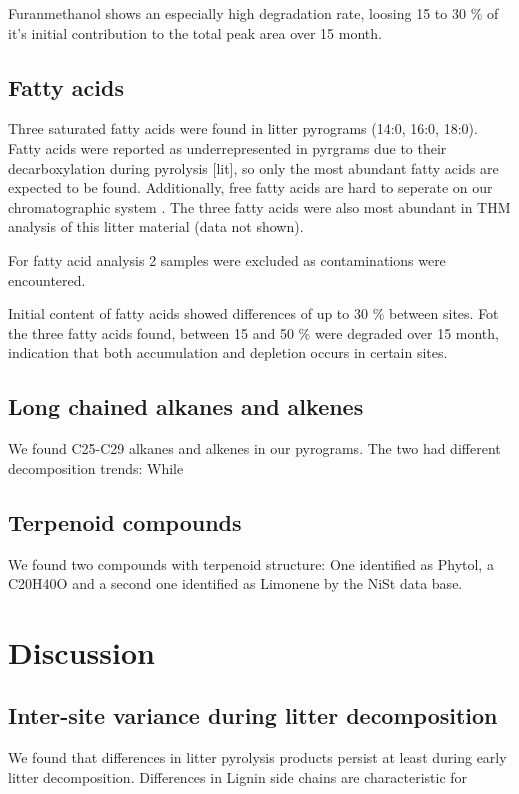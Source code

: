 \documentclass[preprint,review,12pt]{elsarticle}
\begin{document}
Furanmethanol shows an especially high degradation rate, loosing 15 to 30 \% of it's initial contribution to the total peak area over 15 month.

\subsection{Fatty acids}
Three saturated fatty acids were found in litter pyrograms (14:0, 16:0, 18:0). Fatty acids were reported as underrepresented in pyrgrams due to their decarboxylation during pyrolysis [lit], so only the most abundant fatty acids are expected to be found. Additionally, free fatty acids are hard to seperate on our chromatographic system . The three fatty acids were also most abundant in THM analysis of this litter material (data not shown).

For fatty acid analysis 2 samples were excluded as contaminations were encountered.

Initial content of fatty acids showed differences of up to 30 \% between sites.
Fot the three fatty acids found, between 15 and 50 \% were degraded over 15 month, indication that both accumulation and depletion occurs in certain sites.

\subsection{Long chained alkanes and alkenes}

We found C25-C29 alkanes and alkenes in our pyrograms. The two had different decomposition trends: While 

\subsection{Terpenoid compounds}
 
We found two compounds with terpenoid structure:
One identified as Phytol, a C20H40O and a second one identified as Limonene by the NiSt data base. 

\section{Discussion}

\subsection{Inter-site variance during litter decomposition}
We found that differences in litter pyrolysis products persist at least during early litter decomposition. Differences in Lignin side chains are characteristic for 
\end{document}
